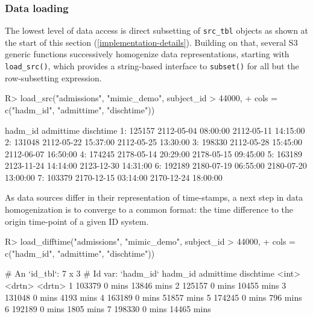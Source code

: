 \documentclass[
  notitle]{jss}
\begin{document}
\hypertarget{data-loading}{%
\subsubsection{Data loading}\label{data-loading}}

The lowest level of data access is direct subsetting of
\texttt{src\_tbl} objects as shown at the start of this section
(\ref{implementation-details}). Building on that, several S3 generic
functions successively homogenize data representations, starting with
\texttt{load\_src()}, which provides a string-based interface to
\texttt{subset()} for all but the row-subsetting expression.

\begin{CodeChunk}
\begin{CodeInput}
R> load_src("admissions", "mimic_demo", subject_id > 44000,
+          cols = c("hadm_id", "admittime", "dischtime"))
\end{CodeInput}
\begin{CodeOutput}
   hadm_id           admittime           dischtime
1:  125157 2112-05-04 08:00:00 2112-05-11 14:15:00
2:  131048 2112-05-22 15:37:00 2112-05-25 13:30:00
3:  198330 2112-05-28 15:45:00 2112-06-07 16:50:00
4:  174245 2178-05-14 20:29:00 2178-05-15 09:45:00
5:  163189 2123-11-24 14:14:00 2123-12-30 14:31:00
6:  192189 2180-07-19 06:55:00 2180-07-20 13:00:00
7:  103379 2170-12-15 03:14:00 2170-12-24 18:00:00
\end{CodeOutput}
\end{CodeChunk}

As data sources differ in their representation of time-stamps, a next
step in data homogenization is to converge to a common format: the time
difference to the origin time-point of a given ID system.

\begin{CodeChunk}
\begin{CodeInput}
R> load_difftime("admissions", "mimic_demo", subject_id > 44000,
+               cols = c("hadm_id", "admittime", "dischtime"))
\end{CodeInput}
\end{CodeChunk}

\begin{CodeChunk}
\begin{CodeOutput}
# An `id_tbl`: 7 x 3
# Id var:      `hadm_id`
  hadm_id admittime dischtime
    <int> <drtn>    <drtn>
1  103379 0 mins    13846 mins
2  125157 0 mins    10455 mins
3  131048 0 mins     4193 mins
4  163189 0 mins    51857 mins
5  174245 0 mins      796 mins
6  192189 0 mins     1805 mins
7  198330 0 mins    14465 mins
\end{CodeOutput}
\end{CodeChunk}
\end{document}
